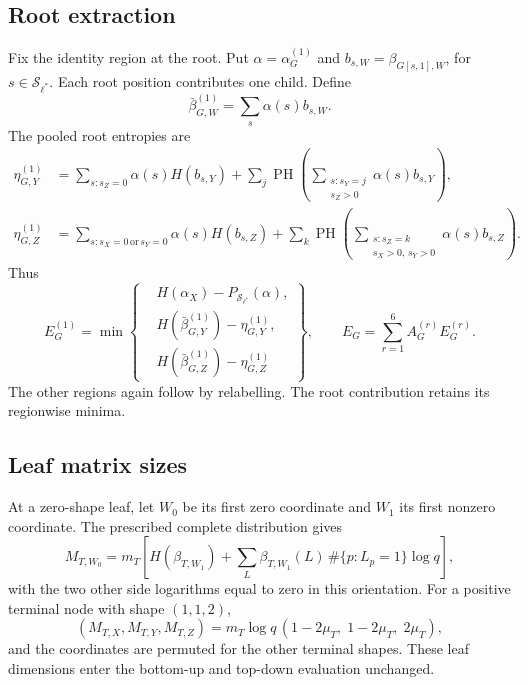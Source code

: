 \documentclass[11pt,a4paper]{article}
\newcommand{\Shapes}{\mathcal S}
\DeclareMathOperator{\PH}{PH}
\begin{document}
\subsection{Root extraction}

Fix the identity region at the root. Put $\alpha=\alpha_G^{(1)}$ and $b_{s,W}=\beta_{G[s,1],W}$, for $s\in\Shapes_{\ell^*}$. Each root position contributes one child. Define
\begin{equation}
\bar\beta_{G,W}^{(1)}=\sum_s\alpha(s)b_{s,W}.
\end{equation}
The pooled root entropies are
\begin{align}
\eta_{G,Y}^{(1)}
&=\sum_{s:s_Z=0}\alpha(s)H(b_{s,Y})
 +\sum_j\PH\!\left(\sum_{\substack{s:s_Y=j\\s_Z>0}}\alpha(s)b_{s,Y}\right),\\
\eta_{G,Z}^{(1)}
&=\sum_{s:s_X=0\,\text{or}\,s_Y=0}\alpha(s)H(b_{s,Z})
 +\sum_k\PH\!\left(\sum_{\substack{s:s_Z=k\\s_X>0,\,s_Y>0}}\alpha(s)b_{s,Z}\right).
\end{align}
Thus
\begin{equation}\label{eq:root-rate}
E_G^{(1)}=\min\!\left\{
\begin{aligned}
&H(\alpha_X)-P_{\Shapes_{\ell^*}}(\alpha),\\
&H(\bar\beta_{G,Y}^{(1)})-\eta_{G,Y}^{(1)},\\
&H(\bar\beta_{G,Z}^{(1)})-\eta_{G,Z}^{(1)}
\end{aligned}\right\},
\qquad E_G=\sum_{r=1}^6A_G^{(r)}E_G^{(r)}.
\end{equation}
The other regions again follow by relabelling. The root contribution retains its regionwise minima.

\subsection{Leaf matrix sizes}

At a zero-shape leaf, let $W_0$ be its first zero coordinate and $W_1$ its first nonzero coordinate. The prescribed complete distribution gives
\begin{equation}\label{eq:zero-M}
M_{T,W_0}=m_T\!\left[
H(\beta_{T,W_1})+
\sum_L\beta_{T,W_1}(L)\,\#\{p:L_p=1\}\log q
\right],
\end{equation}
with the two other side logarithms equal to zero in this orientation.
For a positive terminal node with shape $(1,1,2)$,
\begin{equation}\label{eq:terminal-M}
(M_{T,X},M_{T,Y},M_{T,Z})
=m_T\log q\,(1-2\mu_T,\;1-2\mu_T,\;2\mu_T),
\end{equation}
and the coordinates are permuted for the other terminal shapes. These leaf dimensions enter the bottom-up and top-down evaluation unchanged.
\end{document}

